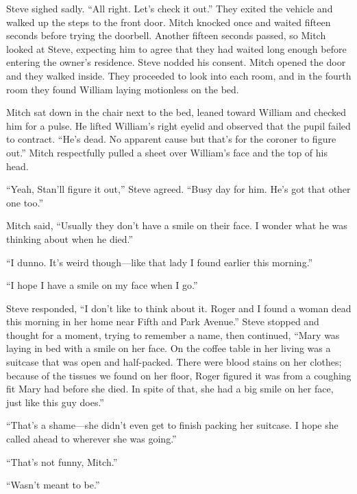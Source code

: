 Steve sighed sadly. “All right. Let's check it out.” They exited the vehicle and walked up the steps to the front door. Mitch knocked once and waited fifteen seconds before trying the doorbell. Another fifteen seconds passed, so Mitch looked at Steve, expecting him to agree that they had waited long enough before entering the owner's residence. Steve nodded his consent. Mitch opened the door and they walked inside. They proceeded to look into each room, and in the fourth room they found William laying motionless on the bed.

Mitch sat down in the chair next to the bed, leaned toward William and checked him for a pulse. He lifted William's right eyelid and observed that the pupil failed to contract. “He's dead. No apparent cause but that's for the coroner to figure out.” Mitch respectfully pulled a sheet over William's face and the top of his head.

“Yeah, Stan'll figure it out,” Steve agreed. “Busy day for him. He's got that other one too.”

Mitch said, “Usually they don't have a smile on their face. I wonder what he was thinking about when he died.”

“I dunno. It's weird though—like that lady I found earlier this morning.”

“I hope I have a smile on my face when I go.”

Steve responded, “I don't like to think about it. Roger and I found a woman dead this morning in her home near Fifth and Park Avenue.” Steve stopped and thought for a moment, trying to remember a name, then continued, “Mary was laying in bed with a smile on her face. On the coffee table in her living was a suitcase that was open and half-packed. There were blood stains on her clothes; because of the tissues we found on her floor, Roger figured it was from a coughing fit Mary had before she died. In spite of that, she had a big smile on her face, just like this guy does.”

“That's a shame—she didn't even get to finish packing her suitcase. I hope she called ahead to wherever she was going.”

“That's not funny, Mitch.”

“Wasn't meant to be.”